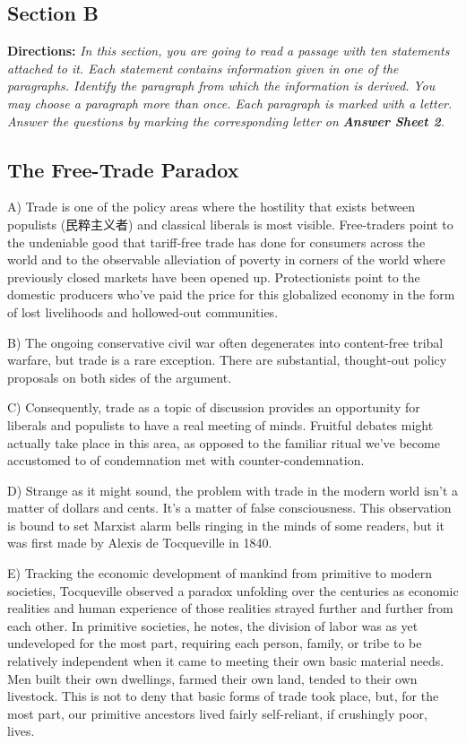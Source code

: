 \documentclass[UTF8,11pt]{ctexart}
\begin{document}
\subsection*{\textbf{Section B}}


\textbf{Directions:} \textit{In this section, you are going to read a passage with ten statements attached to it. Each statement} \textit{contains information given in one of the paragraphs. Identify the paragraph from which the information is derived.} \textit{You may choose a paragraph more than once. Each paragraph is marked with a letter. Answer the questions by} \textit{marking the corresponding letter on }\textbf{\textit{Answer Sheet 2}}\textit{.}


\subsection*{\textbf{The Free-Trade Paradox}}


A) Trade is one of the policy areas where the hostility that exists between populists (民粹主义者) and classical liberals is most visible. Free-traders point to the undeniable good that tariff-free trade has done for consumers across the world and to the observable alleviation of poverty in corners of the world where previously closed markets have been opened up. Protectionists point to the domestic producers who’ve paid the price for this globalized economy in the form of lost livelihoods and hollowed-out communities.


B) The ongoing conservative civil war often degenerates into content-free tribal warfare, but trade is a rare exception. There are substantial, thought-out policy proposals on both sides of the argument.


C) Consequently, trade as a topic of discussion provides an opportunity for liberals and populists to have a real meeting of minds. Fruitful debates might actually take place in this area, as opposed to the familiar ritual we’ve become accustomed to of condemnation met with counter-condemnation.


D) Strange as it might sound, the problem with trade in the modern world isn’t a matter of dollars and cents. It’s a matter of false consciousness. This observation is bound to set Marxist alarm bells ringing in the minds of some readers, but it was first made by Alexis de Tocqueville in 1840.


E) Tracking the economic development of mankind from primitive to modern societies, Tocqueville observed a paradox unfolding over the centuries as economic realities and human experience of those realities strayed further and further from each other. In primitive societies, he notes, the division of labor was as yet undeveloped for the most part, requiring each person, family, or tribe to be relatively independent when it came to meeting their own basic material needs. Men built their own dwellings, farmed their own land, tended to their own livestock. This is not to deny that basic forms of trade took place, but, for the most part, our primitive ancestors lived fairly self-reliant, if crushingly poor, lives.
\end{document}
